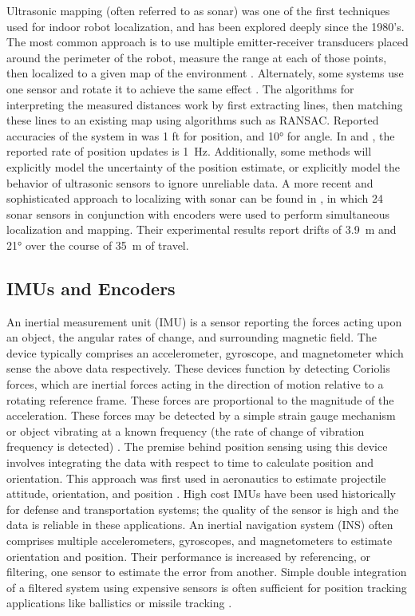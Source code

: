 \documentclass{article}
\begin{document}
    Ultrasonic mapping (often referred to as sonar) was one of the first techniques used for indoor robot localization, and has been explored deeply since the 1980's. The most common approach is to use multiple emitter-receiver transducers placed around the perimeter of the robot, measure the range at each of those points, then localized to a given map of the environment \cite{drumheller_mobile_1987}. Alternately, some systems use one sensor and rotate it to achieve the same effect \cite{leonard_mobile_1991, drumheller_mobile_1987}. The algorithms for interpreting the measured distances work by first extracting lines, then matching these lines to an existing map using algorithms such as RANSAC. Reported accuracies of the system in \cite{drumheller_mobile_1987} was 1 ft for position, and \ang{10} for angle. In \cite{drumheller_mobile_1987} and \cite{leonard_mobile_1991}, the reported rate of position updates is \SI{1}{\hertz}. Additionally, some methods will explicitly model the uncertainty of the position estimate, or explicitly model the behavior of ultrasonic sensors to ignore unreliable data. A more recent and sophisticated approach to localizing with sonar can be found in \cite{tardos_robust_2002}, in which 24 sonar sensors in conjunction with encoders were used to perform simultaneous localization and mapping. Their experimental results report drifts of \SI{3.9}{\meter} and \ang{21} over the course of \SI{35}{\meter} of travel.

  \subsection{IMUs and Encoders}
    An inertial measurement unit (IMU) is a sensor reporting the forces acting upon an object, the angular rates of change, and surrounding magnetic field. The device typically comprises an accelerometer, gyroscope, and magnetometer which sense the above data respectively. These devices function by detecting Coriolis forces, which are inertial forces acting in the direction of motion relative to a rotating reference frame. These forces are proportional to the magnitude of the acceleration. These forces may be detected by a simple strain gauge mechanism or object vibrating at a known frequency (the rate of change of vibration frequency is detected) \cite{barshan_inertial_2017}. The premise behind position sensing using this device involves integrating the data with respect to time to calculate position and orientation. This approach was first used in aeronautics to estimate projectile attitude, orientation, and position \cite{nasa_kalman_1999}. High cost IMUs have been used historically for defense and transportation systems; the quality of the sensor is high and the data is reliable in these applications. An inertial navigation system (INS) often comprises multiple accelerometers, gyroscopes, and magnetometers to estimate orientation and position. Their performance is increased by referencing, or filtering, one sensor to estimate the error from another. Simple double integration of a filtered system using expensive sensors is often sufficient for position tracking applications like ballistics or missile tracking \cite{barshan_inertial_2017}.
\end{document}
